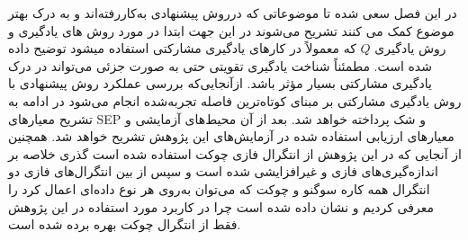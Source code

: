 در این فصل سعی شده تا موضوعاتی که درروش پیشنهادی به‌کاررفته‌اند و به درک بهتر موضوع کمک می کنند تشریح می‌شوند در این جهت ابتدا در مورد روش های یادگیری و روش یادگیری $Q$ که معمولاً در کارهای یادگیری مشارکتی استفاده  میشود توضیح داده شده است. مطمئناً شناخت یادگیری تقویتی حتی به ‌صورت جزئی می‌تواند در درک یادگیری مشارکتی بسیار مؤثر باشد.
ازآنجایی‌که بررسی عملکرد روش پیشنهادی با روش یادگیری مشارکتی بر مبنای کوتاه‌ترین فاصله تجربه‌شده انجام می‌شود در ادامه به تشریح معیارهای SEP و شک پرداخته خواهد شد. بعد از آن محیط‌های آزمایشی و معیارهای ارزیابی استفاده شده در آزمایش‌های این پژوهش تشریح خواهد شد. همچنین از آنجایی که در این پژوهش از انتگرال‌ فازی چوکت استفاده شده است گذری خلاصه بر اندازه‌گیری‌های فازی و غیرافزایشی شده است و سپس از بین انتگرال‌های فازی دو انتگرال همه کاره سوگنو و چوکت که می‌توان به‌روی هر نوع داده‌ای اعمال کرد را معرفی کردیم و نشان داده شده است چرا در کاربرد مورد استفاده در این پژوهش فقط از انتگرال چوکت بهره برده شده است.